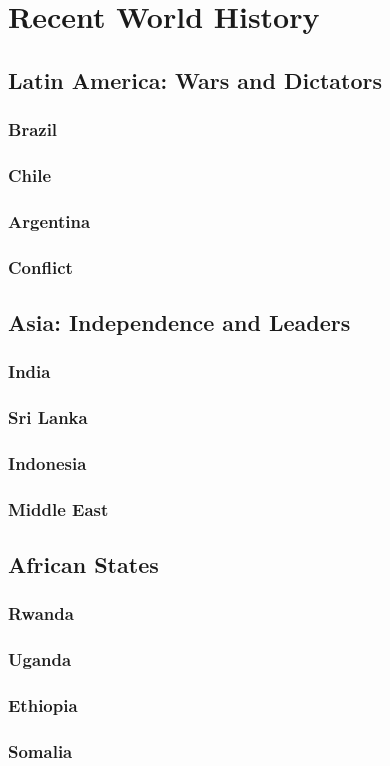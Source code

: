\chapter{Recent World History}

\section{Latin America: Wars and Dictators}

\subsection*{Brazil}

\subsection*{Chile}

\subsection*{Argentina}

\subsection*{Conflict}

\section{Asia: Independence and Leaders}

\subsection*{India}

\subsection*{Sri Lanka}

\subsection*{Indonesia}

\subsection*{Middle East}

\section{African States}

\subsection*{Rwanda}

\subsection*{Uganda}

\subsection*{Ethiopia}

\subsection*{Somalia}
